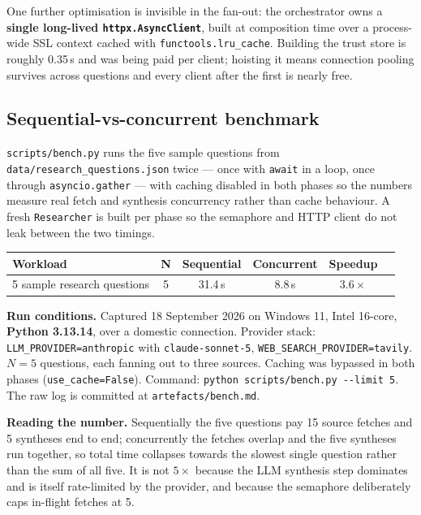 \documentclass[11pt,a4paper]{article}
\begin{document}
One further optimisation is invisible in the fan-out: the orchestrator owns a \textbf{single
long-lived \texttt{httpx.AsyncClient}}, built at composition time over a process-wide SSL context
cached with \texttt{functools.lru\_cache}. Building the trust store is roughly 0.35\,s and was being
paid per client; hoisting it means connection pooling survives across questions and every client
after the first is nearly free.

\subsection{Sequential-vs-concurrent benchmark}

\texttt{scripts/bench.py} runs the five sample questions from
\texttt{data/research\_questions.json} twice --- once with \texttt{await} in a loop, once through
\texttt{asyncio.gather} --- with caching disabled in both phases so the numbers measure real fetch
and synthesis concurrency rather than cache behaviour. A fresh \texttt{Researcher} is built per
phase so the semaphore and HTTP client do not leak between the two timings.

\vspace{0.4em}
\begin{center}
\begin{tabular}{lccccc}
\toprule
\textbf{Workload} & \textbf{N} & \textbf{Sequential} & \textbf{Concurrent} & \textbf{Speedup} \\
\midrule
5 sample research questions & 5 & 31.4\,s & 8.8\,s & $\mathbf{3.6\times}$ \\
\bottomrule
\end{tabular}
\end{center}
\vspace{0.4em}

\textbf{Run conditions.} Captured 18 September 2026 on Windows 11, Intel 16-core, \textbf{Python
3.13.14}, over a domestic connection. Provider stack: \texttt{LLM\_PROVIDER=anthropic} with
\texttt{claude-sonnet-5}, \texttt{WEB\_SEARCH\_PROVIDER=tavily}. $N = 5$ questions, each fanning out
to three sources. Caching was bypassed in both phases (\texttt{use\_cache=False}). Command:
\texttt{python scripts/bench.py -{}-limit 5}. The raw log is committed at
\texttt{artefacts/bench.md}.

\textbf{Reading the number.} Sequentially the five questions pay 15 source fetches and 5 syntheses
end to end; concurrently the fetches overlap and the five syntheses run together, so total time
collapses towards the slowest single question rather than the sum of all five. It is not $5\times$
because the LLM synthesis step dominates and is itself rate-limited by the provider, and because the
semaphore deliberately caps in-flight fetches at 5.
\end{document}
